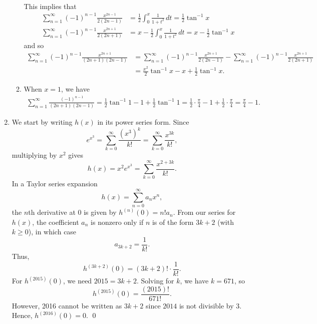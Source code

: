 \documentclass[11pt]{amsart}
\theoremstyle{plain}
\numberwithin{equation}{section}
\begin{document}
\begin{enumerate}[label=\textbf{(\alph*)}]
\begin{enumerate}[label=\textbf{(\roman*)}]
\begin{align*}
\end{align*}
This implies that
\begin{align*}
    \sum_{n=1}^{\infty}(-1)^{n-1}\frac{x^{2n-1}}{2(2n-1)}&=\frac{1}{2}\int_{0}^{x}\frac{1}{1+t^{2}}\,dt=\frac{1}{2}\tan^{-1}x
    \\
    \sum_{n=1}^{\infty}(-1)^{n-1}\frac{x^{2n+1}}{2(2n+1)}&=x-\frac{1}{2}\int_{0}^{x}\frac{1}{1+t^{2}}\,dt=x-\frac{1}{2}\tan^{-1}x
\end{align*}
and so
\begin{align*}
    \sum_{n=1}^{\infty}(-1)^{n-1}\frac{x^{2n+1}}{(2n+1)(2n-1)}&=\sum_{n=1}^{\infty}(-1)^{n-1}\frac{x^{2n+1}}{2(2n-1)}-\sum_{n=1}^{\infty}(-1)^{n-1}\frac{x^{2n+1}}{2(2n+1)}
    \\
    &=\frac{x^{2}}{2}\tan^{-1}x-x+\frac{1}{2}\tan^{-1}x.
\end{align*}
\item When $x=1$, we have
\begin{align*}
    \sum_{n=1}^{\infty}\frac{(-1)^{n-1}}{(2n+1)(2n-1)}=\frac{1}{2}\tan^{-1}1-1+\frac{1}{2}\tan^{-1}1=\frac{1}{2}\cdot\frac{\pi}{4}-1+\frac{1}{2}\cdot\frac{\pi}{4}=\frac{\pi}{4}-1.
\end{align*}
    \end{enumerate} 
\item We start by writing \(h(x)\) in its power series form. Since
\[
e^{x^3}=\sum_{k=0}^{\infty}\frac{(x^3)^k}{k!}=\sum_{k=0}^{\infty}\frac{x^{3k}}{k!},
\]
multiplying by \(x^2\) gives
\[
h(x)=x^2e^{x^3}=\sum_{k=0}^{\infty}\frac{x^{2+3k}}{k!}.
\]
In a Taylor series expansion
\[
h(x)=\sum_{n=0}^{\infty}a_nx^n,
\]
the \(n\)th derivative at 0 is given by $h^{(n)}(0)=n!a_n$. From our series for \(h(x)\), the coefficient \(a_n\) is nonzero only if \(n\) is of the form \(3k+2\) (with \(k\ge0\)), in which case
\[
a_{3k+2}=\frac{1}{k!}.
\]
Thus,
\[
h^{(3k+2)}(0)=(3k+2)!\cdot\frac{1}{k!}.
\]
For \(h^{(2015)}(0)\), we need \(2015=3k+2\). Solving for \(k\), we have $k=671$, so \[h^{\left(2015\right)}\left(0\right)=\frac{\left(2015\right)!}{671!}.\]
However, 2016 cannot be written as $3k+2$ since $2014$ is not divisible by 3. Hence, $h^{\left(2016\right)}\left(0\right)=0$. \qed 
\end{enumerate}
\end{document}
